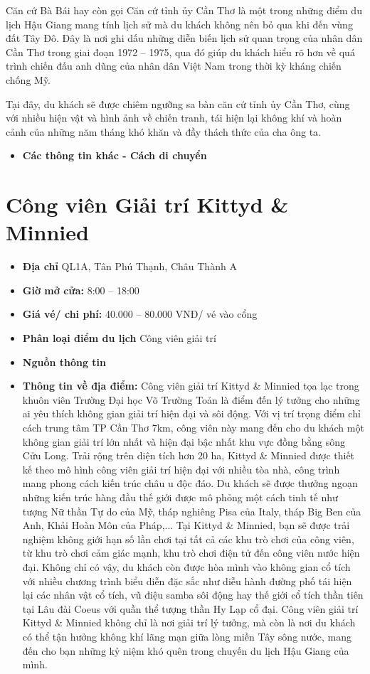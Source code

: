 \documentclass{article}
\begin{document}
Căn cứ Bà Bái hay còn gọi Căn cứ tỉnh ủy Cần Thơ là một trong những điểm du lịch Hậu Giang mang tính lịch sử mà du khách không nên bỏ qua khi đến vùng đất Tây Đô. Đây là nơi ghi dấu những diễn biến lịch sử quan trọng của nhân dân Cần Thơ trong giai đoạn 1972 – 1975, qua đó giúp du khách hiểu rõ hơn về quá trình chiến đấu anh dũng của nhân dân Việt Nam trong thời kỳ kháng chiến chống Mỹ.

Tại đây, du khách sẽ được chiêm ngưỡng sa bàn căn cứ tỉnh ủy Cần Thơ, cùng với nhiều hiện vật và hình ảnh về chiến tranh, tái hiện lại không khí và hoàn cảnh của những năm tháng khó khăn và đầy thách thức của cha ông ta.

\begin{itemize}
    \item{\textbf{Các thông tin khác - Cách di chuyển}}
\end{itemize}

\section{Công viên Giải trí Kittyd \& Minnied}
\begin{itemize}
    \item{\textbf{Địa chỉ}} QL1A, Tân Phú Thạnh, Châu Thành A
    \item{\textbf{Giờ mở cửa:}} 8:00 – 18:00
    \item{\textbf{Giá vé/ chi phí:}} 40.000 – 80.000 VNĐ/ vé vào cổng
    \item{\textbf{Phân loại điểm du lịch} } Công viên giải trí
    \item{\textbf{Nguồn thông tin}}
    \item{\textbf{Thông tin về địa điểm:}} Công viên giải trí Kittyd \& Minnied tọa lạc trong khuôn viên Trường Đại học Võ Trường Toản là điểm đến lý tưởng cho những ai yêu thích không gian giải trí hiện đại và sôi động. Với vị trí trọng điểm chỉ cách trung tâm TP Cần Thơ 7km, công viên này mang đến cho du khách một không gian giải trí lớn nhất và hiện đại bậc nhất khu vực đồng bằng sông Cửu Long. Trải rộng trên diện tích hơn 20 ha, Kittyd \& Minnied được thiết kế theo mô hình công viên giải trí hiện đại với nhiều tòa nhà, công trình mang phong cách kiến trúc châu u độc đáo. Du khách sẽ được thưởng ngoạn những kiến trúc hàng đầu thế giới được mô phỏng một cách tinh tế như tượng Nữ thần Tự do của Mỹ, tháp nghiêng Pisa của Italy, tháp Big Ben của Anh, Khải Hoàn Môn của Pháp,... Tại Kittyd \& Minnied, bạn sẽ được trải nghiệm không giới hạn số lần chơi tại tất cả các khu trò chơi của công viên, từ khu trò chơi cảm giác mạnh, khu trò chơi điện tử đến công viên nước hiện đại. Không chỉ có vậy, du khách còn được hòa mình vào không gian cổ tích với nhiều chương trình biểu diễn đặc sắc như diễu hành đường phố tái hiện lại các nhân vật cổ tích, vũ điệu samba sôi động hay thế giới cổ tích thần tiên tại Lâu đài Coeus với quần thể tượng thần Hy Lạp cổ đại. Công viên giải trí Kittyd \& Minnied không chỉ là nơi giải trí lý tưởng, mà còn là nơi du khách có thể tận hưởng không khí lãng mạn giữa lòng miền Tây sông nước, mang đến cho bạn những kỷ niệm khó quên trong chuyến du lịch Hậu Giang của mình.
\end{itemize}
\end{document}
